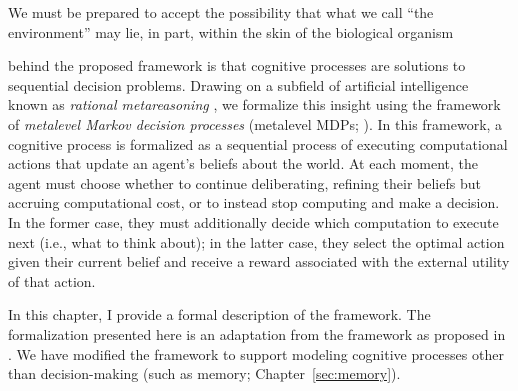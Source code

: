 \begin{savequote}[75mm]
We must be prepared to accept the possibility that what we call ``the environment'' may lie, in part, within the skin of the biological organism
\end{savequote}


 behind the proposed framework is that cognitive processes are solutions to sequential decision problems. Drawing on a subfield of artificial intelligence known as \emph{rational metareasoning} \citep{matheson1968economic,russell1991principles}, we formalize this insight using the framework of \emph{metalevel Markov decision processes} (metalevel MDPs; \citealp{hay2012selecting}). In this framework, a cognitive process is formalized as a sequential process of executing computational actions that update an agent's beliefs about the world. At each moment, the agent must choose whether to continue deliberating, refining their beliefs but accruing computational cost, or to instead stop computing and make a decision. In the former case, they must additionally decide which computation to execute next (i.e., what to think about); in the latter case, they select the optimal action given their current belief and receive a reward associated with the external utility of that action.


In this chapter, I provide a formal description of the framework. The formalization presented here is an adaptation from the framework as proposed in \citet{hay2016principles}. We have modified the framework to support modeling cognitive processes other than decision-making (such as memory; Chapter~\ref{sec:memory}).


